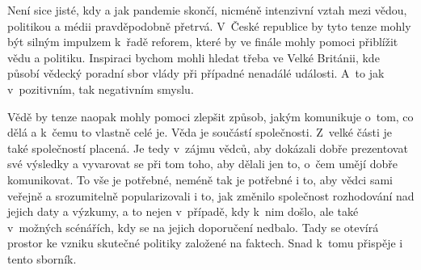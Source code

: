 Není sice jisté, kdy a jak pandemie skončí, nicméně intenzivní vztah mezi vědou, politikou a médii pravděpodobně přetrvá. V~České republice by tyto tenze mohly být silným impulzem k~řadě reforem, které by ve finále mohly pomoci přiblížit vědu a politiku. Inspiraci bychom mohli hledat třeba ve Velké Británii, kde působí vědecký poradní sbor vlády při případné nenadálé události. A~to jak v~pozitivním, tak negativním smyslu.

Vědě by tenze naopak mohly pomoci zlepšit způsob, jakým komunikuje o~tom, co dělá a k~čemu to vlastně celé je. Věda je součástí společnosti. Z~velké části je také společností placená. Je tedy v~zájmu vědců, aby dokázali dobře prezentovat své výsledky a vyvarovat se při tom toho, aby dělali jen to, o~čem umějí dobře komunikovat. To vše je potřebné, neméně tak je potřebné i to, aby vědci sami veřejně a srozumitelně popularizovali i to, jak změnilo společnost rozhodování nad jejich daty a výzkumy, a to nejen v~případě, kdy k~nim došlo, ale také v~možných scénářích, kdy se na jejich doporučení nedbalo. Tady se otevírá prostor ke vzniku skutečné politiky založené na faktech. Snad k~tomu přispěje i tento sborník.

